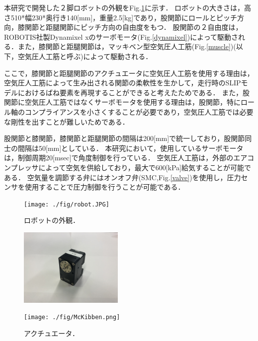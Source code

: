 本研究で開発した２脚ロボットの外観をFig.\ref{robot_outline}に示す．
ロボットの大きさは，高さ510*幅230*奥行き140[mm]，重量2.5[kg]であり，股関節にロールとピッチ方向，膝関節と距腿関節にピッチ方向の自由度をもつ．
股関節の２自由度は，ROBOTIS社製Dynamixel xのサーボモータ(Fig.\ref{dynamixel})によって駆動される．また，膝関節と距腿関節は，マッキベン型空気圧人工筋(Fig.\ref{muscle})(以下，空気圧人工筋と呼ぶ)によって駆動される．

ここで，膝関節と距腿関節のアクチュエータに空気圧人工筋を使用する理由は，空気圧人工筋によって生み出される関節の柔軟性を生かして，走行時のSLIPモデルにおけるばね要素を再現することができると考えたためである．
また，股関節に空気圧人工筋ではなくサーボモータを使用する理由は，股関節，特にロール軸のコンプライアンスを小さくすることが必要であり，空気圧人工筋では必要な剛性を出すことが難しいためである．

股関節と膝関節，膝関節と距腿関節の間隔は200[mm]で統一しており，股関節同士の間隔は50[mm]としている．
本研究において，使用しているサーボモータは，制御周期20[msec]で角度制御を行っている．
空気圧人工筋は，外部のエアコンプレッサによって空気を供給しており，最大で600[kPa]給気することが可能である．
空気量を調節する弁にはオンオフ弁(SMC,Fig.\ref{valve})を使用し，圧力センサを使用することで圧力制御を行うことが可能である．



\begin{figure}[htbp]
 \centering
 \texttt{[image: ./fig/robot.JPG]}
    \caption{ロボットの外観．\label{robot_outline}}
\end{figure}

\begin{figure}
  \begin{minipage}[b]{.5\hsize}
   \centering
   \includegraphics[clip,width=5.0cm]{./fig/dynamixel.JPG}
  \end{minipage}
  \begin{minipage}[b]{.5\hsize}
   \centering
   \texttt{[image: ./fig/McKibben.png]}
  \end{minipage}
  \caption{アクチュエータ．\label{actuator}}
\end{figure}

